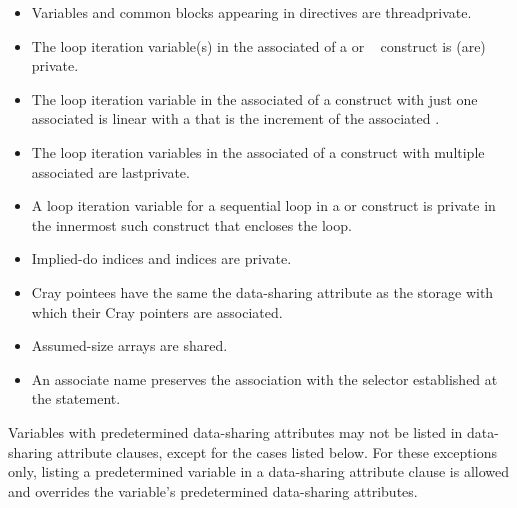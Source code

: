 \fortranspecificstart
\begin{itemize}
\item Variables and common blocks appearing in  directives are 
threadprivate. 

\item The loop iteration variable(s) in the associated  of a  or ~ 
construct is (are) private. 

\item The loop iteration variable in the associated  of a  construct with just 
one associated  is linear with a  that is the increment of 
the associated .

\item The loop iteration variables in the associated  of a  construct with 
multiple associated  are lastprivate. 

\item A loop iteration variable for a sequential loop in a  or  construct is 
private in the innermost such construct that encloses the loop.

\item Implied-do indices and  indices are private. 

\item Cray pointees have the same the data-sharing attribute as the storage with which their Cray 
pointers are associated.

\item Assumed-size arrays are shared.
\nopagebreak
\item An associate name preserves the association with the selector established at the 
 statement.
\end{itemize}
\fortranspecificend

Variables with predetermined data-sharing attributes may not be listed in data-sharing 
attribute clauses, except for the cases listed below. For these exceptions only, listing a 
predetermined variable in a data-sharing attribute clause is allowed and overrides the 
variable’s predetermined data-sharing attributes.

